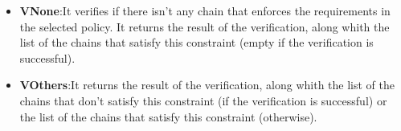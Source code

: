 \begin{itemize}
 \item \textbf{VNone}:It verifies if there isn't any chain that enforces the requirements in the selected policy. It returns the result of the verification, along whith the list of the chains that satisfy this constraint (empty if the verification is successful).
 \item \textbf{VOthers}:It returns the result of the verification, along whith the list of the chains that don't satisfy this constraint (if the verification is successful) or the list of the chains that satisfy this constraint (otherwise).
\end{itemize}